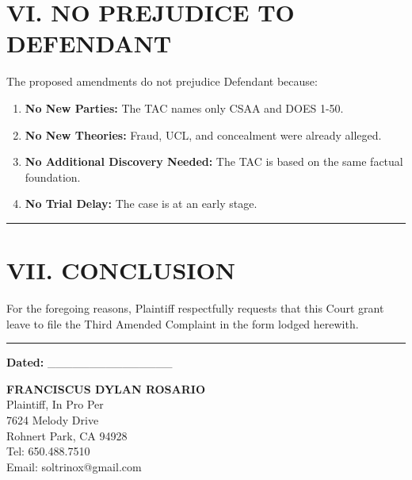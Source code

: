 \label{toc:vi-no-prejudice-to-defendant}
\section{VI. NO PREJUDICE TO DEFENDANT}\label{vi.-no-prejudice-to-defendant}

The proposed amendments do not prejudice Defendant because:

\begin{enumerate}
\def\labelenumi{\arabic{enumi}.}
\tightlist
\item
  \textbf{No New Parties:} The TAC names only CSAA and DOES 1-50.
\item
  \textbf{No New Theories:} Fraud, UCL, and concealment were already alleged.
\item
  \textbf{No Additional Discovery Needed:} The TAC is based on the same factual foundation.
\item
  \textbf{No Trial Delay:} The case is at an early stage.
\end{enumerate}

\begin{center}\rule{0.5\linewidth}{0.5pt}\end{center}

\label{toc:vii-conclusion}
\section{VII. CONCLUSION}\label{vii.-conclusion}

For the foregoing reasons, Plaintiff respectfully requests that this Court grant leave to file the Third Amended Complaint in the form lodged herewith.

\begin{center}\rule{0.5\linewidth}{0.5pt}\end{center}

\textbf{Dated:} \_\_\_\_\_\_\_\_\_\_\_\_\_\_\_

\textbf{FRANCISCUS DYLAN ROSARIO}\\
Plaintiff, In Pro Per\\
7624 Melody Drive\\
Rohnert Park, CA 94928\\
Tel: 650.488.7510\\
Email: soltrinox@gmail.com

\nolinenumbers



